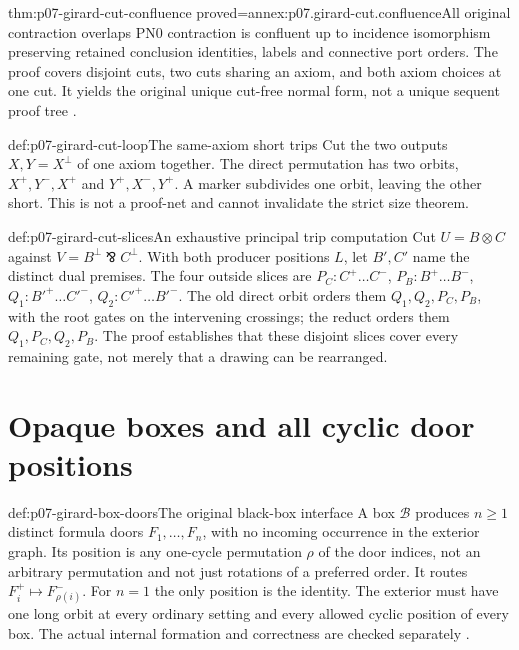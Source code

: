 \begin{hbtheorem}{thm:p07-girard-cut-confluence}
 {proved=annex:p07.girard-cut.confluence}{All original contraction overlaps}
PN0 contraction is confluent up to incidence isomorphism preserving
retained conclusion identities, labels and connective port orders.
The proof covers disjoint cuts, two cuts sharing an axiom, and both
axiom choices at one cut. It yields the original unique cut-free
normal form, not a unique sequent proof tree
\cite[Proposition~2.11 and Theorem~2.12, p.~42]{Girard1987AuthorHosted}.
\end{hbtheorem}

\begin{hbexample}{def:p07-girard-cut-loop}{The same-axiom short trips}
Cut the two outputs \(X,Y=X^\perp\) of one axiom together.
The direct permutation has two orbits,
\(X^+,Y^-,X^+\) and \(Y^+,X^-,Y^+\).
A marker subdivides one orbit, leaving the other short.
This is not a proof-net and cannot invalidate the strict size theorem.
\end{hbexample}

\begin{hbexample}{def:p07-girard-cut-slices}{An exhaustive principal trip computation}
Cut \(U=B\otimes C\) against \(V=B^\perp\bindnasrepma C^\perp\).
With both producer positions \(L\), let \(B',C'\) name the distinct
dual premises. The four outside slices are
\(P_C:C^+\ldots C^-\), \(P_B:B^+\ldots B^-\),
\(Q_1:B'^+\ldots C'^-\), \(Q_2:C'^+\ldots B'^-\).
The old direct orbit orders them \(Q_1,Q_2,P_C,P_B\), with the root
gates on the intervening crossings; the reduct orders them
\(Q_1,P_C,Q_2,P_B\). The proof establishes that these disjoint slices
cover every remaining gate, not merely that a drawing can be rearranged.
\end{hbexample}

\section{Opaque boxes and all cyclic door positions}
\label{sec:p07-girard-opaque-boxes}

\begin{hbdefinition}{def:p07-girard-box-doors}{The original black-box interface}
A box \(\mathcal B\) produces \(n\geq1\) distinct formula doors
\(F_1,\ldots,F_n\), with no incoming occurrence in the exterior graph.
Its position is any one-cycle permutation \(\rho\) of the door
indices, not an arbitrary permutation and not just rotations of a
preferred order. It routes \(F_i^+\mapsto F_{\rho(i)}^-\).
For \(n=1\) the only position is the identity.
The exterior must have one long orbit at every ordinary setting and
every allowed cyclic position of every box. The actual internal
formation and correctness are checked separately
\cite[Definition~2.14, pp.~43--44]{Girard1987AuthorHosted}.
\end{hbdefinition}

